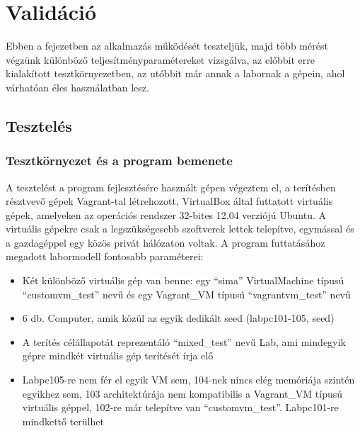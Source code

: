 \chapter{Validáció}
\label{chp:validation}

Ebben a fejezetben az alkalmazás működését teszteljük, majd több mérést végzünk különböző teljesítményparamétereket vizsgálva, az előbbit erre kialakított tesztkörnyezetben, az utóbbit már annak a labornak a gépein, ahol várhatóan éles használatban lesz.

\section{Tesztelés}

%
\subsection{Tesztkörnyezet és a program bemenete}
%

A tesztelést a program fejlesztésére használt gépen végeztem el, a terítésben résztvevő gépek Vagrant-tal létrehozott, VirtualBox által futtatott virtuális gépek, amelyeken az operációs rendszer 32-bites 12.04 verziójú Ubuntu\cite{ubuntu}. A virtuális gépekre csak a legszükségesebb szoftverek lettek telepítve, egymással és a gazdagéppel egy közös privát hálózaton voltak. A program futtatásához megadott labormodell fontosabb paraméterei:

\begin{itemize}
  \item Két különböző virtuális gép van benne: egy ``sima'' VirtualMachine típusú ``customvm\_test'' nevű és egy Vagrant\_VM típusú ``vagrantvm\_test'' nevű
  \item 6 db. Computer, amik közül az egyik dedikált seed (labpc101-105, seed)
  \item A terítés célállapotát reprezentáló ``mixed\_test'' nevű Lab, ami mindegyik gépre mindkét virtuális gép terítését írja elő
  \item Labpc105-re nem fér el egyik VM sem, 104-nek nincs elég memóriája szintén egyikhez sem, 103 architektúrája nem kompatibilis a Vagrant\_VM típusú virtuális géppel, 102-re már telepítve van ``customvm\_test''. Labpc101-re mindkettő terülhet
\end{itemize}

